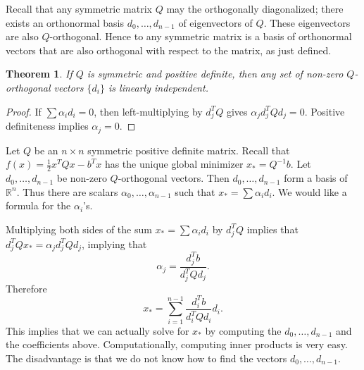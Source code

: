 \documentclass[11pt]{article}
\newcommand{\R}{\mathbb{R}}
\newtheorem{theorem}{Theorem}[subsection]
\begin{document}
Recall that any symmetric matrix $Q$ may the orthogonally diagonalized; there exists an orthonormal basis $d_0, \dots, d_{n-1}$ of eigenvectors of $Q$. These eigenvectors are also $Q$-orthogonal. Hence to any symmetric matrix is a basis of orthonormal vectors that are also orthogonal with respect to the matrix, as just defined.

\begin{theorem}
If $Q$ is symmetric and positive definite, then any set of non-zero $Q$-orthogonal vectors $\{d_i\}$ is linearly independent.
\end{theorem}
\begin{proof}
If $\sum \alpha_i d_i = 0$, then left-multiplying by $d_j^TQ$ gives $\alpha_j d_j^T Q d_j = 0$. Positive definiteness implies $\alpha_j = 0$. 
\end{proof}

Let $Q$ be an $n \times n$ symmetric positive definite matrix. Recall that $f(x) = \frac{1}{2}x^TQx - b^Tx$ has the unique global minimizer $x_* = Q^{-1}b$. Let $d_0, \dots, d_{n-1}$ be non-zero $Q$-orthogonal vectors. Then $d_0, \dots, d_{n-1}$ form a basis of $\R^n$. Thus there are scalars $\alpha_0, \dots, \alpha_{n-1}$ such that $x_* = \sum \alpha_i d_i$. We would like a formula for the $\alpha_i$'s.

Multiplying both sides of the sum $x_* = \sum \alpha_i d_i$ by $d_j^TQ$ implies that $d_j^TQx_* = \alpha_j d_j^TQd_j$, implying that
\[
\alpha_j = \frac{d_j^T b}{d_j^TQd_j}.
\]
Therefore
\[
x_* = \sum_{i=1}^{n-1} \frac{d_i^Tb}{d_i^TQd_i}  d_i.
\]
This implies that we can actually solve for $x_*$ by computing the $d_0, \dots, d_{n-1}$ and the coefficients above. Computationally, computing inner products is very easy. The disadvantage is that we do not know how to find the vectors $d_0, \dots, d_{n-1}$.
\end{document}
